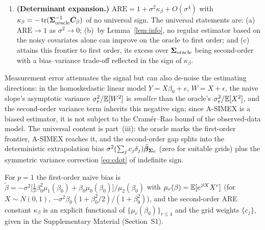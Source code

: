 \begin{theorem}
\begin{enumerate}
\begin{align}
         +\Cov\bigl(\bm\psi^{(0)},\dot{\bm\psi}_k\bigr),
        \nonumber\\
        \dot{\bm\psi}_j
        &=-e^{\bet_0^\top X}
         \Bigl[\bigl(\delta_j\tilde\bet_{\bSig_0}^\top X
                +\tfrac{\lambda_j}{2}\bet_0^\top\bSig_0\bet_0\bigr)X
               +\lambda_j\bSig_0\bet_0\Bigr],
        \label{eq:vdot}
      \end{align}
      where $\delta_j=1+\lambda_j$,
      $\bm g_0=\E[e^{\bet_0^\top X}X]$, and
      $\bm\psi^{(0)}=YX-e^{\bet_0^\top X}X$ is the oracle influence
      function. In general $\dot{\bm C}_\beta$ is
      \emph{indefinite}: neither
      $\dot{\bm C}_\beta\succeq\bm 0$ nor
      $\dot{\bm C}_\beta\preceq\bm 0$ holds universally.
\item[(iii)] \textbf{(Determinant expansion.)}
      $\mathrm{ARE}=1+\sigma^2\kappa_\beta+O(\sigma^4)$ with
      $\kappa_\beta=-\operatorname{tr}
      (\bm{\Sigma}_{\mathrm{oracle}}^{-1}\dot{\bm C}_\beta)$ of no universal
      sign. The universal statements are: (a)~$\mathrm{ARE}\to1$ as
      $\sigma^2\to0$; (b)~by Lemma~\ref{lem:info}, no regular
      estimator based on the noisy covariates alone can improve on the
      oracle to first order; and (c)~\asimex{} attains this frontier
      to first order, its excess over $\bm{\Sigma}_{\mathrm{oracle}}$ being
      second-order with a bias--variance trade-off reflected in the
      sign of $\kappa_\beta$.
\end{enumerate}
\end{theorem}

\begin{remark}\label{rem:psd}
Measurement error attenuates the signal but can also de-noise the
estimating directions: in the homoskedastic linear model
$Y=X\beta_0+e$, $W=X+\epsilon$, the naive slope's asymptotic variance
$\sigma_e^2/\mathbb{E}[W^2]$ is \emph{smaller} than the oracle's
$\sigma_e^2/\mathbb{E}[X^2]$, and the second-order variance term inherits this
negative sign; since A-SIMEX is a biased estimator, it is not subject
to the Cram\'er--Rao bound of the observed-data model. The universal
content is part~(iii): the oracle marks the first-order frontier,
A-SIMEX reaches it, and the second-order gap splits into the
deterministic extrapolation bias
$\sigma^2(\sum_jc_j\delta_j)\tilde{\bm{\beta}}_{\bm{\Sigma}_0}$ (zero for suitable
grids) plus the symmetric variance correction \eqref{eq:cdot} of
indefinite sign.
\end{remark}

\begin{corollary}\label{cor:scalar}
For $p=1$ the first-order naive bias is
$\tilde\beta=-\sigma^2\bigl[\tfrac12\beta_0^2\mu_1(\beta_0)
+\beta_0\mu_0(\beta_0)\bigr]/\mu_2(\beta_0)$ with
$\mu_r(\beta)=\mathbb{E}[e^{\beta X}X^r]$ (for $X\sim N(0,1)$,
$-\sigma^2\beta_0(1+\beta_0^2/2)/(1+\beta_0^2)$), and the
second-order ARE constant $\kappa_\beta$ is an explicit functional of
$\{\mu_r(\beta_0)\}_{r\le4}$ and the grid weights $\{c_j\}$, given in
the Supplementary Material (Section~S1).
\end{corollary}
